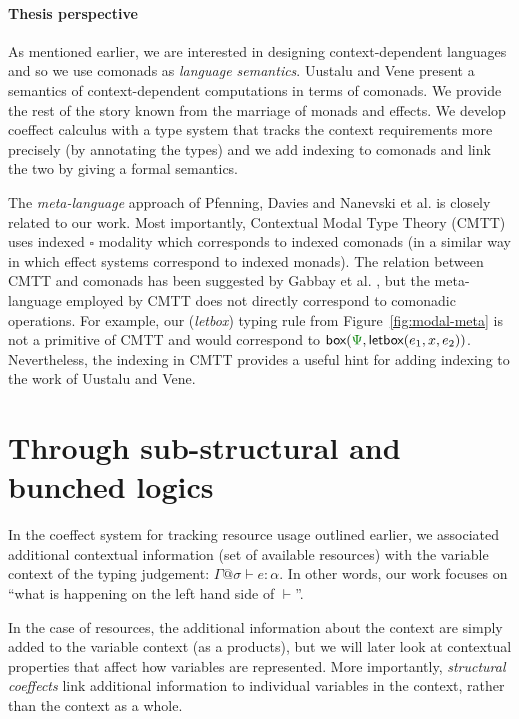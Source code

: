   
\paragraph{Thesis perspective}
As mentioned earlier, we are interested in designing context-dependent languages and so we
use comonads as \emph{language semantics}. Uustalu and Vene present a semantics of 
context-dependent computations in terms of comonads. We provide the rest of the story known 
from the marriage of monads and effects. We develop coeffect calculus with a type system that 
tracks the context requirements more precisely (by annotating the types) and we add indexing 
to comonads and link the two by giving a formal semantics. 

The \emph{meta-language} approach of Pfenning, Davies and Nanevski et al. is closely related to
our work. Most importantly, Contextual Modal Type Theory (CMTT) uses indexed $\square$ modality
which corresponds to indexed comonads (in a similar way in which effect systems correspond to 
indexed monads). The relation between CMTT and comonads has been suggested by
Gabbay et al. \cite{logic-cmtt-semantics}, but the meta-language employed by CMTT does not 
directly correspond to comonadic operations. For example, our (\emph{letbox}) typing rule from
Figure~\ref{fig:modal-meta} is not a primitive of CMTT and would correspond to 
$\ident{box}(\cclrd{\Psi}, \ident{letbox}(e_1, x, e_2))$. Nevertheless, the indexing in 
CMTT provides a useful hint for adding indexing to the work of Uustalu and Vene.


\section{Through sub-structural and bunched logics}
\label{sec:path-logic}

In the coeffect system for tracking resource usage outlined earlier, we associated additional
contextual information (set of available resources) with the variable context of the typing 
judgement: $\Gamma @ \sigma \vdash e : \alpha$. In other words, our work focuses on ``what is
happening on the left hand side of $\vdash$''.

In the case of resources, the additional information about the context are simply added to the
variable context (as a products), but we will later look at contextual properties that affect 
how variables are represented. More importantly, \emph{structural coeffects} link additional
information to individual variables in the context, rather than the context as a whole.

